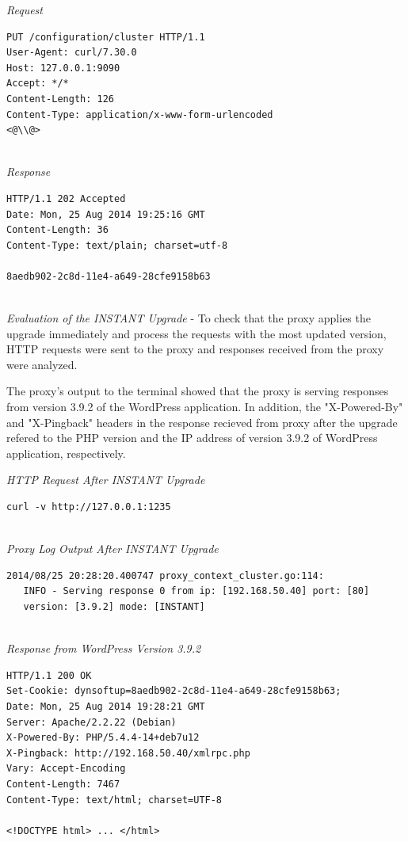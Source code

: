 \documentclass[a4paper,11pt,twoside]{report}
\begin{document}
\noindent
\textit{Request}
\begin{lstlisting}[language=terminal]
PUT /configuration/cluster HTTP/1.1
User-Agent: curl/7.30.0
Host: 127.0.0.1:9090
Accept: */*
Content-Length: 126
Content-Type: application/x-www-form-urlencoded
<@\\@>
\end{lstlisting}

\noindent\\
\textit{Response}
\begin{lstlisting}[language=terminal]
HTTP/1.1 202 Accepted
Date: Mon, 25 Aug 2014 19:25:16 GMT
Content-Length: 36
Content-Type: text/plain; charset=utf-8

8aedb902-2c8d-11e4-a649-28cfe9158b63
\end{lstlisting}  

\noindent\\
\textit{Evaluation of the INSTANT Upgrade} - To check that the proxy applies the upgrade immediately and process the requests with the most updated version, HTTP requests were sent to the proxy and responses received from the proxy were analyzed.

The proxy's output to the terminal showed that the proxy is serving responses from version 3.9.2 of the WordPress application. In addition, the "X-Powered-By" and "X-Pingback" headers in the response recieved from proxy after the upgrade refered to the PHP version and the IP address of version 3.9.2 of WordPress application, respectively. \smallskip 

\noindent
\textit{HTTP Request After INSTANT Upgrade}
\begin{lstlisting}[language=terminal]
curl -v http://127.0.0.1:1235
\end{lstlisting}

\noindent\\
\textit{Proxy Log Output After INSTANT Upgrade}
\begin{lstlisting}[language=terminal]
2014/08/25 20:28:20.400747 proxy_context_cluster.go:114:     
   INFO - Serving response 0 from ip: [192.168.50.40] port: [80] 
   version: [3.9.2] mode: [INSTANT]
\end{lstlisting}

\noindent\\
\textit{Response from WordPress Version 3.9.2 }
\begin{lstlisting}[language=terminal]
HTTP/1.1 200 OK
Set-Cookie: dynsoftup=8aedb902-2c8d-11e4-a649-28cfe9158b63;
Date: Mon, 25 Aug 2014 19:28:21 GMT
Server: Apache/2.2.22 (Debian)
X-Powered-By: PHP/5.4.4-14+deb7u12
X-Pingback: http://192.168.50.40/xmlrpc.php
Vary: Accept-Encoding
Content-Length: 7467
Content-Type: text/html; charset=UTF-8

<!DOCTYPE html> ... </html>
\end{lstlisting}
\end{document}
